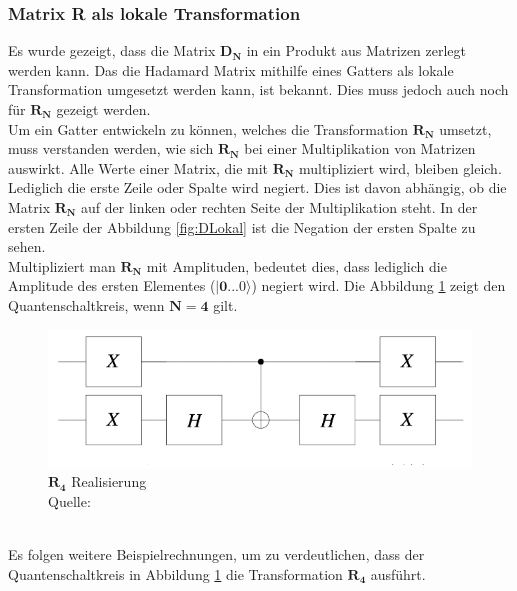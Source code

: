 \subsubsection{Matrix R als lokale Transformation}
Es wurde gezeigt, dass die Matrix $\mathbf{D_N}$ in ein Produkt aus Matrizen zerlegt werden kann. Das die Hadamard Matrix mithilfe eines Gatters als lokale Transformation umgesetzt werden kann, ist bekannt. Dies muss jedoch auch noch für $\mathbf{R_N}$ gezeigt werden. 
\\
Um ein Gatter entwickeln zu können, welches die Transformation $\mathbf{R_N}$ umsetzt, muss verstanden werden, wie sich $\mathbf{R_N}$ bei einer Multiplikation von Matrizen auswirkt. Alle Werte einer Matrix, die mit $\mathbf{R_N}$ multipliziert wird, bleiben gleich. Lediglich die erste Zeile oder Spalte wird negiert. Dies ist davon abhängig, ob die Matrix $\mathbf{R_N}$ auf der linken oder rechten Seite der Multiplikation steht. In der ersten Zeile der Abbildung \ref{fig:DLokal} ist die Negation der ersten Spalte zu sehen.
\\
Multipliziert man $\mathbf{R_N}$ mit Amplituden, bedeutet dies, dass lediglich die Amplitude des ersten Elementes ($\mathbf{|0...0\rangle}$) negiert wird.
Die Abbildung \ref{fig:Rgatter} zeigt den Quantenschaltkreis, wenn $\mathbf{N = 4}$ gilt.
\begin{figure}[hbtp]
	\centering
	\includegraphics[width=.8\textwidth]{figures/rgatter.png}
	\caption{$\mathbf{R_4}$ Realisierung \\ Quelle: \cite[S. 145]{Homeister.2018}}
	\label{fig:Rgatter}
\end{figure}
\\
Es folgen weitere Beispielrechnungen, um zu verdeutlichen, dass der Quantenschaltkreis in Abbildung \ref{fig:Rgatter} die Transformation $\mathbf{R_4}$ ausführt.
